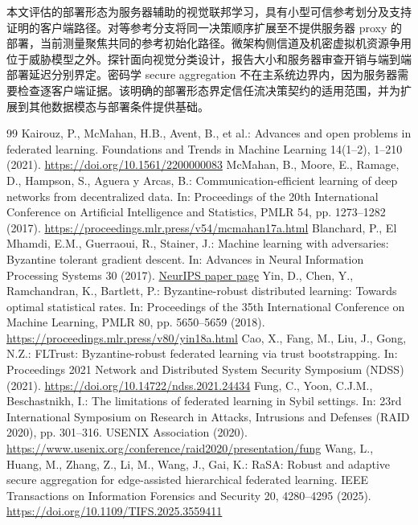 \documentclass[10pt,a4paper,UTF8,fontset=fandol]{ctexart}
\begin{document}
本文评估的部署形态为服务器辅助的视觉联邦学习，具有小型可信参考划分及支持证明的客户端路径。对等参考分支将同一决策顺序扩展至不提供服务器 proxy 的部署，当前测量聚焦共同的参考初始化路径。微架构侧信道及机密虚拟机资源争用位于威胁模型之外。探针面向视觉分类设计，报告大小和服务器审查开销与端到端部署延迟分别界定。密码学 secure aggregation 不在主系统边界内，因为服务器需要检查逐客户端证据。该明确的部署形态界定信任流决策契约的适用范围，并为扩展到其他数据模态与部署条件提供基础。

\begingroup
\small
\begin{thebibliography}{99}
    \setlength{\itemsep}{0pt}
     Kairouz, P., McMahan, H.B., Avent, B., et al.: Advances and open problems in federated learning. Foundations and Trends in Machine Learning 14(1--2), 1--210 (2021). \url{https://doi.org/10.1561/2200000083}
     McMahan, B., Moore, E., Ramage, D., Hampson, S., Aguera y Arcas, B.: Communication-efficient learning of deep networks from decentralized data. In: Proceedings of the 20th International Conference on Artificial Intelligence and Statistics, PMLR 54, pp. 1273--1282 (2017). \url{https://proceedings.mlr.press/v54/mcmahan17a.html}
     Blanchard, P., El Mhamdi, E.M., Guerraoui, R., Stainer, J.: Machine learning with adversaries: Byzantine tolerant gradient descent. In: Advances in Neural Information Processing Systems 30 (2017). \href{https://papers.nips.cc/paper/6617-machine-learning-with-adversaries-byzantine-tolerant-gradient-descent}{NeurIPS paper page}
     Yin, D., Chen, Y., Ramchandran, K., Bartlett, P.: Byzantine-robust distributed learning: Towards optimal statistical rates. In: Proceedings of the 35th International Conference on Machine Learning, PMLR 80, pp. 5650--5659 (2018). \url{https://proceedings.mlr.press/v80/yin18a.html}
     Cao, X., Fang, M., Liu, J., Gong, N.Z.: FLTrust: Byzantine-robust federated learning via trust bootstrapping. In: Proceedings 2021 Network and Distributed System Security Symposium (NDSS) (2021). \url{https://doi.org/10.14722/ndss.2021.24434}
     Fung, C., Yoon, C.J.M., Beschastnikh, I.: The limitations of federated learning in Sybil settings. In: 23rd International Symposium on Research in Attacks, Intrusions and Defenses (RAID 2020), pp. 301--316. USENIX Association (2020). \url{https://www.usenix.org/conference/raid2020/presentation/fung}
     Wang, L., Huang, M., Zhang, Z., Li, M., Wang, J., Gai, K.: RaSA: Robust and adaptive secure aggregation for edge-assisted hierarchical federated learning. IEEE Transactions on Information Forensics and Security 20, 4280--4295 (2025). \url{https://doi.org/10.1109/TIFS.2025.3559411}

\end{thebibliography}
\end{document}
